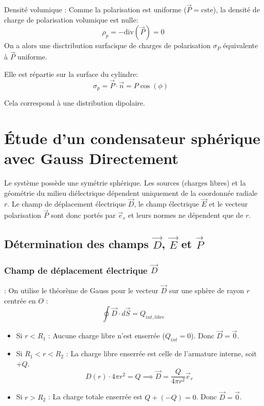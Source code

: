 \documentclass[french]{yLectureNote}
\renewcommand{\vec}{\overrightarrow}
\begin{document}
 Densité volumique : Comme la polarisation est uniforme ($\vec{P} = \text{cste}$), la densité de charge de polarisation volumique est nulle:
    $$\rho_p = -\text{div}(\vec{P}) = 0$$
On a alors une disctribution surfacique de charges de polarisation $\sigma_P$ équivalente à $\vec{P}$ uniforme.

Elle est répartie sur la surface du cylindre:
    $$\sigma_p = \vec{P} \cdot \vec{n} = P \cos(\phi) \text{ }$$

Cela correspond à une distribution dipolaire.
\section{Étude d'un condensateur sphérique avec Gauss Directement}


Le système possède une symétrie sphérique. Les sources (charges libres) et la géométrie du milieu diélectrique dépendent uniquement de la coordonnée radiale $r$.
Le champ de déplacement électrique $\vec{D}$, le champ électrique $\vec{E}$ et le vecteur polarisation $\vec{P}$ sont donc portés par $\vec{e}_r$ et leurs normes ne dépendent que de $r$.
\subsection{Détermination des champs $\vec{D}$, $\vec{E}$ et $\vec{P}$}
\subsubsection{Champ de déplacement électrique $\vec{D}$} :
On utilise le théorème de Gauss pour le vecteur $\vec{D}$ sur une sphère de rayon $r$ centrée en $O$ :
$$\oint \vec{D} \cdot d\vec{S} = Q_{int,libre}$$
\begin{itemize}
    \item Si $r < R_1$ : Aucune charge libre n'est enserrée ($Q_{int} = 0$). Donc $\vec{D} = \vec{0}$.
\item Si $R_1 < r < R_2$ : La charge libre enserrée est celle de l'armature interne, soit $+Q$.
    $$D(r) \cdot 4\pi r^2 = Q \implies \vec{D} = \frac{Q}{4\pi r^2} \vec{e}_r$$
\item Si $r > R_2$ : La charge totale enserrée est $Q + (-Q) = 0$. Donc $\vec{D} = \vec{0}$.
\end{itemize}
\end{document}

